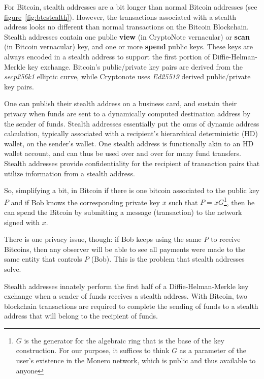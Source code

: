 For Bitcoin, stealth addresses are a bit longer than normal Bitcoin addresses (see \hyperref[fig:btcstealth]{figure}~\ref{fig:btcstealth}). However, the transactions associated with a stealth address looks no different than normal transactions on the Bitcoin Blockchain. Stealth addresses contain one public \textbf{view} (in CryptoNote vernacular) or \textbf{scan} (in Bitcoin vernacular) key, and one or more \textbf{spend} public keys. These keys are always encoded in a stealth address to support the first portion of Diffie-Helman-Merkle key exchange. Bitcoin's public/private key pairs are derived from the \emph{secp256k1} elliptic curve, while Cryptonote uses \emph{Ed25519} derived public/private key pairs.

One can publish their stealth address on a business card, and sustain their privacy when funds are sent to a dynamically computed destination address by the sender of funds. Stealth addresses essentially put the onus of dynamic address calculation, typically associated with a recipient's hierarchical deterministic (HD) wallet, on the sender's wallet. One stealth address is functionally akin to an HD wallet account, and can thus be used over and over for many fund transfers. Stealth addresses provide confidentiality for the recipient of transaction pairs that utilize information from a stealth address.

So, simplifying a bit, in Bitcoin if there is one bitcoin associated to the public key $P$ and if Bob knows the corresponding private key $x$ such that $P = xG$\footnote{$G$ is the generator for the algebraic ring that is the base of the key construction. For our purpose, it suffices to think $G$ as a parameter of the user's existence in the Monero network, which is public and thus available to anyone}, then he can spend the Bitcoin by submitting a message (transaction) to the network signed with $x$.

There is one privacy issue, though: if Bob keeps using the same $P$ to receive Bitcoins, then any observer will be able to see all payments were made to the same entity that controls $P$ (Bob). This is the problem that stealth addresses solve.

Stealth addresses innately perform the first half of a Diffie-Helman-Merkle key exchange when a sender of funds receives a stealth address. With Bitcoin, two blockchain transactions are required to complete the sending of funds to a stealth address that will belong to the recipient of funds.

